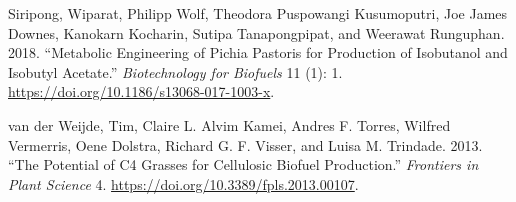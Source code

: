 \documentclass[12pt,twoside]{report}
\begin{document}
\begin{CSLReferences}{1}{0}
\leavevmode\hypertarget{ref-siripong2018}{}%
Siripong, Wiparat, Philipp Wolf, Theodora Puspowangi Kusumoputri, Joe James Downes, Kanokarn Kocharin, Sutipa Tanapongpipat, and Weerawat Runguphan. 2018. {``Metabolic Engineering of {Pichia} Pastoris for Production of Isobutanol and Isobutyl Acetate.''} \emph{Biotechnology for Biofuels} 11 (1): 1. \url{https://doi.org/10.1186/s13068-017-1003-x}.

\leavevmode\hypertarget{ref-vanderweijde2013}{}%
van der Weijde, Tim, Claire L. Alvim Kamei, Andres F. Torres, Wilfred Vermerris, Oene Dolstra, Richard G. F. Visser, and Luisa M. Trindade. 2013. {``The Potential of {C4} Grasses for Cellulosic Biofuel Production.''} \emph{Frontiers in Plant Science} 4. \url{https://doi.org/10.3389/fpls.2013.00107}.

\end{CSLReferences}
\end{document}
